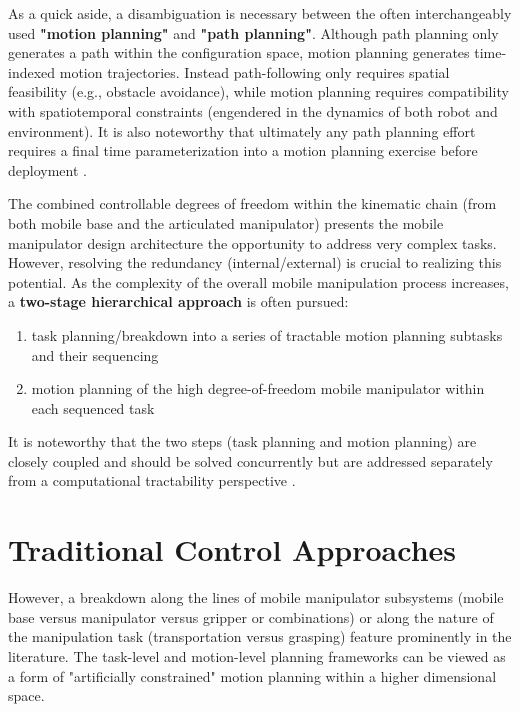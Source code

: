 As a quick aside, a disambiguation is necessary between the often interchangeably used
\textbf{"motion planning"} and \textbf{"path planning"}.
Although path planning only generates a path within the configuration space,
motion planning generates time-indexed motion trajectories. Instead path-following only requires
spatial feasibility (e.g., obstacle avoidance), while motion planning
requires compatibility with spatiotemporal constraints (engendered in the dynamics of both robot and
environment). It is also noteworthy that ultimately any path planning effort requires a final time
parameterization into a motion planning exercise before deployment \cite{thakar2023survey}.

The combined controllable degrees of freedom within the kinematic chain (from both
mobile base and the articulated manipulator) presents the mobile
manipulator design architecture the opportunity to address very
complex tasks. However, resolving the redundancy (internal/external) is crucial to realizing
this potential. As the complexity of the overall mobile manipulation process
increases, a \textbf{two-stage hierarchical approach} is often pursued:
\begin{enumerate}
	\item task planning/breakdown into a series of tractable motion planning subtasks and their sequencing
	\item motion planning of the high degree-of-freedom mobile manipulator within each sequenced task
\end{enumerate}
It is noteworthy that the two steps (task planning and motion planning) are closely coupled
and should be solved concurrently but are addressed separately from a computational tractability
perspective \cite{thakar2023survey}.

\section{Traditional Control Approaches}

However, a breakdown along the lines of mobile manipulator subsystems
(mobile base versus manipulator versus gripper or combinations)
or along the nature of the manipulation task (transportation versus grasping) feature prominently
in the literature. The task-level and motion-level planning frameworks
can be viewed as a form of "artificially constrained" motion planning within a higher dimensional space.

